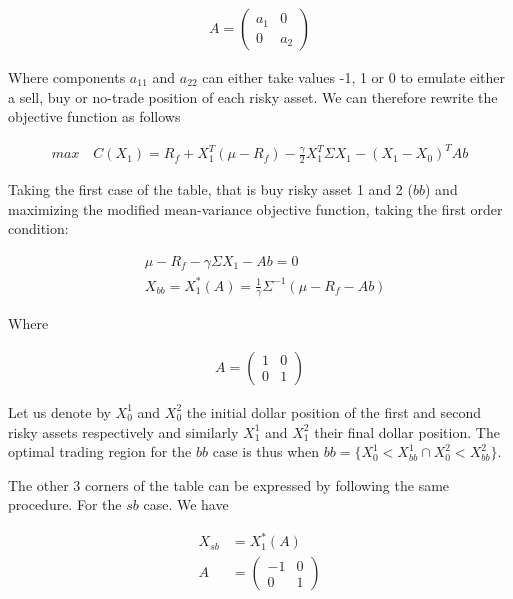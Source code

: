 \documentclass[10pt]{article}
\begin{document}
\begin{align*}
	A = \begin{pmatrix}
a_{1} & 0\\
0 & a_{2}
\end{pmatrix}
\end{align*}

Where components $a_{11}$ and $a_{22}$ can either take values -1, 1 or 0 to emulate either a sell, buy or no-trade position of each risky asset. We can therefore rewrite the objective function as follows

\begin{align*}
	max \quad C(X_1) = R_f  + X_1^T(\mu - R_f)  - \frac{\gamma}{2} X_1^T \Sigma X_1  - (X_1  - X_0)^TAb
\end{align*}

Taking the first case of the table, that is buy risky asset 1 and 2 ($bb$) and maximizing the modified mean-variance objective function, taking the first order condition: 

\begin{align*}
	& \mu - R_f - \gamma \Sigma X_1 - Ab = 0\\
	& X_{bb} = X_1^*(A) = \frac{1}{\gamma}\Sigma^{-1} (\mu - R_f - Ab)
\end{align*}

Where 

\begin{align*}
	A = \begin{pmatrix}
	1 & 0\\	
	0 & 1
\end{pmatrix}
\end{align*}

Let us denote by $X_0^1$ and $X_0^2$ the initial dollar position of the first and second risky assets respectively and similarly $X_1^1$ and $X_1^2$ their final dollar position. The optimal trading region for the $bb$ case is thus when $bb = \{X_0^1 < X_{bb}^1 \cap  X_0^2 < X_{bb}^2\}$.

\bigbreak

The other 3 corners of the table can be expressed by following the same procedure. For the $sb$ case. We have 

\begin{align*}
	X_{sb} &= X_1^*(A) \\
	A &=  \begin{pmatrix}
	-1 & 0\\	
	0 & 1
\end{pmatrix}
\end{align*}
\end{document}
